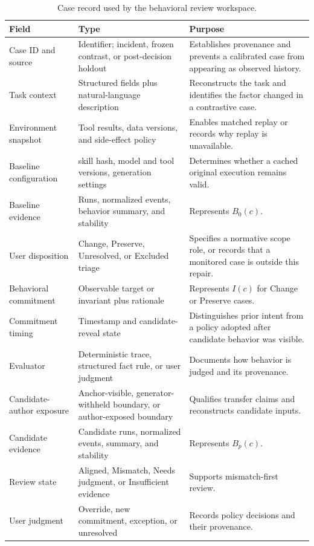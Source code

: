 \begin{table}[t]
    \caption{Case record used by the behavioral review workspace.}
    \label{tab:case-schema}
    \small
    \begin{tabularx}{\textwidth}{@{}p{}p{}Y@{}}
        \toprule
        \textbf{Field} & \textbf{Type} & \textbf{Purpose} \\
        \midrule
        Case ID and source & Identifier; incident, frozen contrast, or post-decision holdout & Establishes provenance and prevents a calibrated case from appearing as observed history. \\
        Task context & Structured fields plus natural-language description & Reconstructs the task and identifies the factor changed in a contrastive case. \\
        Environment snapshot & Tool results, data versions, and side-effect policy & Enables matched replay or records why replay is unavailable. \\
        Baseline configuration & skill hash, model and tool versions, generation settings & Determines whether a cached original execution remains valid. \\
        Baseline evidence & Runs, normalized events, behavior summary, and stability & Represents $B_0(c)$. \\
        User disposition & Change, Preserve, Unresolved, or Excluded triage & Specifies a normative scope role, or records that a monitored case is outside this repair. \\
        Behavioral commitment & Observable target or invariant plus rationale & Represents $I(c)$ for Change or Preserve cases. \\
        Commitment timing & Timestamp and candidate-reveal state & Distinguishes prior intent from a policy adopted after candidate behavior was visible. \\
        Evaluator & Deterministic trace, structured fact rule, or user judgment & Documents how behavior is judged and its provenance. \\
        Candidate-author exposure & Anchor-visible, generator-withheld boundary, or author-exposed boundary & Qualifies transfer claims and reconstructs candidate inputs. \\
        Candidate evidence & Candidate runs, normalized events, summary, and stability & Represents $B_p(c)$. \\
        Review state & Aligned, Mismatch, Needs judgment, or Insufficient evidence & Supports mismatch-first review. \\
        User judgment & Override, new commitment, exception, or unresolved & Records policy decisions and their provenance. \\
        \bottomrule
    \end{tabularx}
\end{table}

